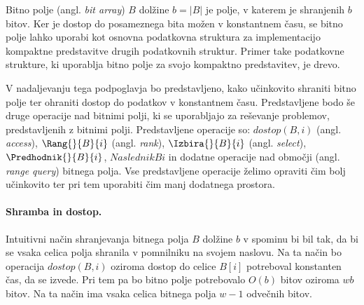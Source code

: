 Bitno polje (angl. \textit{bit array}) $B$ dolžine $b=|B|$ je polje, v katerem je shranjenih $b$ bitov. Ker je dostop do posameznega bita možen v konstantnem času, se bitno polje lahko uporabi kot osnovna podatkovna struktura za implementacijo kompaktne predstavitve drugih podatkovnih struktur. Primer take podatkovne strukture, ki uporablja bitno polje za svojo kompaktno predstavitev, je drevo.

V nadaljevanju tega podpoglavja bo predstavljeno, kako učinkovito shraniti bitno polje ter ohraniti dostop do podatkov v konstantnem času. Predstavljene bodo še druge operacije nad bitnimi polji, ki se uporabljajo za reševanje problemov, predstavljenih z bitnimi polji. Predstavljene operacije so: $dostop(B,i)$ (angl. \textit{access}), $\Rang{}{B}{i}$ (angl. \textit{rank}), $\Izbira{}{B}{i}$ (angl. \textit{select}), $\Predhodnik{}{B}{i}$, $Naslednik{}{B}{i}$ in dodatne operacije nad območji (angl. \textit{range query}) bitnega polja. Vse predstavljene operacije želimo opraviti čim bolj učinkovito ter pri tem uporabiti čim manj dodatnega prostora.


\paragraph{Shramba in dostop.}

Intuitivni način shranjevanja bitnega polja $B$ dolžine $b$ v spominu bi bil tak, da bi se vsaka celica polja shranila v pomnilniku na svojem naslovu. Na ta način bo operacija $dostop(B,i)$ oziroma dostop do celice $B[i]$ potreboval konstanten čas, da se izvede. Pri tem pa bo bitno polje potrebovalo $O(b)$ bitov oziroma $wb$ bitov. Na ta način ima vsaka celica bitnega polja $w-1$ odvečnih bitov. 

